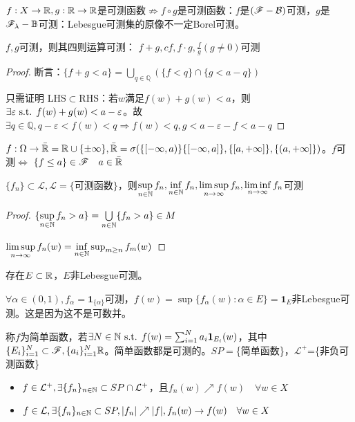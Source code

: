 \documentclass{ctexbook}
\begin{document}
$f: X\to \mathbb{R},g: \mathbb{R}\to \mathbb{R}$是可测函数$\not\Rightarrow f\circ g$是可测函数：$f$是$(\mathscr{F}-\mathcal{B})$可测，$g$是$\mathscr{F}_{\lambda}-\mathbb{B}$可测：Lebesgue可测集的原像不一定Borel可测。

\begin{Prop}
  $f,g$可测，则其四则运算可测： $f+g, cf,f\cdot g, \frac{f}{g}(g\neq 0)$可测
\end{Prop}

\begin{proof}
  断言：$\{f+g<a\}=\bigcup_{q\in\mathbb{Q}}(\{f<q\}\cap\{g<a-q\})$

  只需证明 LHS$\subset$RHS：若$w$满足$f(w)+g(w)<a$，则$\exists \varepsilon\text{ s.t. } f(w)+g(w)<a-\varepsilon$。故$\exists q\in\mathbb{Q},q-\varepsilon<f(w)<q\Rightarrow f(w)<q, g<a-\varepsilon-f<a-q$
\end{proof}

\begin{Rmk}
  $f:\Omega\to\bar{\mathbb{R}}=\mathbb{R}\cup\{\pm \infty\}, \mathbb{\bar{\mathbb{R}}}=\sigma(\{[-\infty,a)\}\{[-\infty,a]\},\{[a,+\infty]\},\{(a,+\infty]\})$。$f$可测$\Leftrightarrow$ $\{f\leq a\}\in\mathscr{F}\quad a\in\bar{\mathbb{R}}$
\end{Rmk}

\begin{Prop}
  $\{f_{n}\}\subset \mathcal{L},\mathcal{L}=\{\text{可测函数}\}$，则$\sup\limits_{n\in\mathbb{N}} f_{n},\inf\limits_{n\in\mathbb{N}}f_{n},\limsup\limits_{n\to\infty}f_{n},\liminf\limits_{n\to\infty}f_{n}$可测
\end{Prop}
\begin{proof}
  $\{\sup\limits_{n\in\mathbb{N}}f_{n}>a\}=\bigcup\limits_{n\in\mathbb{N}}\{f_{n}>a\}\in M$

  $\limsup\limits_{n\to\infty}f_{n}(w)=\inf\limits_{n\in\mathbb{N}}\sup_{m\geq n}f_{m}(w)$
\end{proof}

\begin{Eg}
  存在$E\subset \mathbb{R}$，$E$非Lebesgue可测。

  $\forall \alpha\in(0,1),f_{\alpha}=\bm{1}_{\{\alpha\}}$可测，$f(w)=\sup\{f_{\alpha}(w):\alpha\in E\}=\bm{1}_{E}$非Lebesgue可测。这是因为这不是可数并。
\end{Eg}
\begin{Def}
  称$f$为简单函数，若$\exists N\in\mathbb{N}\text{ s.t. } f(w)=\sum_{i=1}^{N}a_{i}\bm{1}_{E_{i}}(w)$，其中$\{E_{i}\}_{i=1}^{N}\subset \mathscr{F}, \{a_{i}\}_{i=1}^{N}\mathbb{R}$。简单函数都是可测的。$SP=$\{简单函数\}，$\mathcal{L}^{+}$=\{非负可测函数\}
\end{Def}

\begin{Prop}[简单函数逼近可测函数]
  \begin{itemize}
  \item $f\in \mathcal{L}^{+},\exists \{f_{n}\}_{n\in\mathbb{N}}\subset SP\cap \mathcal{L}^{+}$，且$f_{n}(w)\nearrow f(w)\quad\forall w\in X$
  \item $f\in \mathcal{L},\exists \{f_{n}\}_{n\in\mathbb{N}}\subset SP,|f_{n}|\nearrow |f|,f_{n}(w)\to f(w)\quad \forall w\in X$
  \end{itemize}
\end{Prop}
\end{document}
